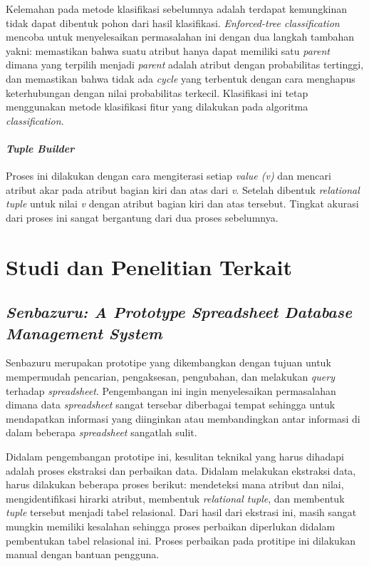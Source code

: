         Kelemahan pada metode klasifikasi sebelumnya adalah terdapat kemungkinan tidak dapat dibentuk pohon dari hasil klasifikasi. \textit{Enforced-tree classification} mencoba untuk menyelesaikan permasalahan ini dengan dua langkah tambahan yakni: memastikan bahwa suatu atribut hanya dapat memiliki satu \textit{parent} dimana yang terpilih menjadi \textit{parent} adalah atribut dengan probabilitas tertinggi, dan memastikan bahwa tidak ada \textit{cycle} yang terbentuk dengan cara menghapus keterhubungan dengan nilai probabilitas terkecil. Klasifikasi ini tetap menggunakan metode klasifikasi fitur yang dilakukan pada algoritma \textit{classification}.

        \paragraph{\textit{Tuple Builder}}
        Proses ini dilakukan dengan cara mengiterasi setiap \textit{value (v)} dan mencari atribut akar pada atribut bagian kiri dan atas dari \textit{v}. Setelah dibentuk \textit{relational tuple} untuk nilai \textit{v} dengan atribut bagian kiri dan atas tersebut. Tingkat akurasi dari proses ini sangat bergantung dari dua proses sebelumnya.


\section{Studi dan Penelitian Terkait}
    \subsection{\textit{Senbazuru: A Prototype Spreadsheet Database Management System}}
    Senbazuru \parencite{Chen2013-2} merupakan prototipe yang dikembangkan dengan tujuan untuk mempermudah pencarian, pengaksesan, pengubahan, dan melakukan \textit{query} terhadap \textit{spreadsheet}. Pengembangan ini ingin menyelesaikan permasalahan dimana data \textit{spreadsheet} sangat tersebar diberbagai tempat sehingga untuk mendapatkan informasi yang diinginkan atau membandingkan antar informasi di dalam beberapa \textit{spreadsheet} sangatlah sulit. 

    Didalam pengembangan prototipe ini, kesulitan teknikal yang harus dihadapi adalah proses ekstraksi dan perbaikan data. Didalam melakukan ekstraksi data, harus dilakukan beberapa proses berikut: mendeteksi mana atribut dan nilai, mengidentifikasi hirarki atribut, membentuk \textit{relational tuple}, dan membentuk \textit{tuple} tersebut menjadi tabel relasional. Dari hasil dari ekstrasi ini, masih sangat mungkin memiliki kesalahan sehingga proses perbaikan diperlukan didalam pembentukan tabel relasional ini. Proses perbaikan pada protitipe ini dilakukan manual dengan bantuan pengguna.

